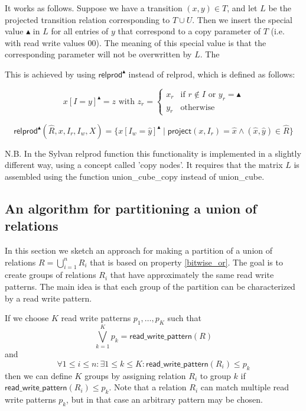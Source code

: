 \documentclass{article}
\begin{document}
\noindent
It works as follows. Suppose we have a transition $(x, y) \in T$, and let $L$ be the projected transition relation corresponding to $T \cup U$. Then we insert the special value $\blacktriangle$ in $L$ for all entries of $y$ that correspond to a copy parameter of $T$ (i.e. with read write values 00). The meaning of this special value is that the corresponding parameter will not be overwritten by $L$. The 

This is achieved by using
$\textsf{relprod}^\blacktriangle$ instead of \textsf{relprod}, which is
defined as follows:

\[
x[I = y]^\blacktriangle = z \text{ with } z_r = 
  \left\{
    \begin{array}{ll}
         x_r & \text{if } r \notin I \text{ or } y_r = \blacktriangle \\
         y_r & \text{otherwise}
    \end{array}
  \right. 
\]

\[
    \textsf{relprod}^\blacktriangle(\hat{R}, x, I_r, I_w, X) =
        \{ 
          x[I_w = \hat{y}]^\blacktriangle \mid \textsf{project}(x, I_r) = \hat{x} \land 
          (\hat{x}, \hat{y}) \in \hat{R}
        \}
\]

N.B. In the Sylvan \textsf{relprod} function this functionality is implemented in a slightly different way, using a concept called 'copy nodes'. It requires that the matrix $L$ is assembled using the function \textsf{union\_cube\_copy} instead of \textsf{union\_cube}.  

\subsection{An algorithm for partitioning a union of relations}
In this section we sketch an approach for making a partition of a union of relations $R = \bigcup_{i=1}^n R_i$ that is based on property \ref{bitwise_or}. The goal is to create groups of relations $R_i$ that have approximately the same read write patterns. The main idea is that each group of the partition can be characterized by a read write pattern.

\vspace{0.5cm}
\noindent
If we choose $K$ read write patterns $p_1, \ldots, p_K$ such that
\[
\bigvee\limits_{k=1}^K p_k = \textsf{read\_write\_pattern}(R)
\]
and
\[
\forall 1 \leq i \leq n: \exists 1 \leq k \leq K: \textsf{read\_write\_pattern}(R_i) \leq p_k
\]
then we can define $K$ groups by assigning relation $R_i$ to group $k$ if $\textsf{read\_write\_pattern}(R_i) \leq p_k$. Note that a
relation $R_i$ can match multiple read write patterns $p_k$, but in that case an arbitrary pattern may be chosen.
\end{document}
